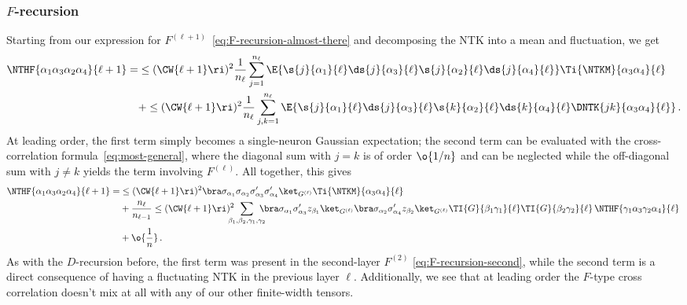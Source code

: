\subsubsection{$F$-recursion}
Starting from our expression for $F^{(\ell+1)}$~\eqref{eq:F-recursion-almost-there} and decomposing the NTK into a mean and fluctuation, we get
\begin{align}
\NTHF{\alpha_1\alpha_3\alpha_2\alpha_4}{\ell+1}=&\le(\CW{\ell+1}\ri)^2\frac{1}{n_{\ell}}\sum_{j=1}^{n_{\ell}}\E{\s{j}{\alpha_1}{\ell}\ds{j}{\alpha_3}{\ell}\s{j}{\alpha_2}{\ell}\ds{j}{\alpha_4}{\ell}}\Ti{\NTKM}{\alpha_3\alpha_4}{\ell}\, \\
&+\le(\CW{\ell+1}\ri)^2\frac{1}{n_{\ell}}\sum_{j,k=1}^{n_{\ell}}\E{\s{j}{\alpha_1}{\ell}\ds{j}{\alpha_3}{\ell}\s{k}{\alpha_2}{\ell}\ds{k}{\alpha_4}{\ell}\DNTK{jk}{\alpha_3\alpha_4}{\ell}}\, .\nonumber
\end{align}
At leading order, the first term simply becomes a single-neuron Gaussian expectation; the second term can be evaluated with the cross-correlation formula~\eqref{eq:most-general}, where the diagonal sum with $j=k$ is of order $\o{1/n}$ and can be neglected while the off-diagonal sum with $j\ne k$ yields the term involving $F^{(\ell)}$. All together, this gives
\begin{align}\label{eq:F-recursion}
\NTHF{\alpha_1\alpha_3\alpha_2\alpha_4}{\ell+1}
=&\le(\CW{\ell+1}\ri)^2\bra\sigma_{\alpha_1}\sigma_{\alpha_2}\sigma^{\prime}_{\alpha_3}\sigma^{\prime}_{\alpha_4}\ket_{G^{(\ell)}}\Ti{\NTKM}{\alpha_3\alpha_4}{\ell}\, \\
&+\frac{n_{\ell}}{n_{\ell-1}}\le(\CW{\ell+1}\ri)^2\!\!\!\!\!\sum_{\beta_1,\beta_2,\gamma_1,\gamma_2}\!\!\!\!\!\bra \sigma_{\alpha_1}\sigma^{\prime}_{\alpha_3}z_{\beta_1}\ket_{G^{(\ell)}}\bra \sigma_{\alpha_2}\sigma^{\prime}_{\alpha_4}z_{\beta_2}\ket_{G^{(\ell)}}\TI{G}{\beta_1\gamma_1}{\ell}\TI{G}{\beta_2\gamma_2}{\ell}\,\NTHF{\gamma_1\alpha_3\gamma_2\alpha_4}{\ell}\, \nonumber\\
&+\o{\frac{1}{n}}\, . \notag
\end{align}
As with the $D$-recursion before, the first term was present in the second-layer $F^{(2)}$ \eqref{eq:F-recursion-second}, while the second term is a direct consequence of having a fluctuating NTK in the previous layer $\ell$. Additionally, we see that at leading order the $F$-type cross correlation doesn't mix at all with any of our other finite-width tensors.


